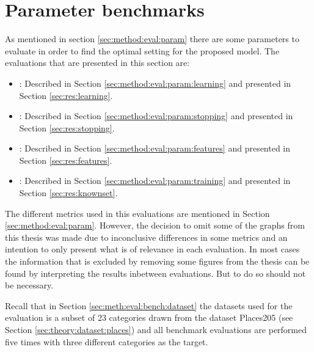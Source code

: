 \section{Parameter benchmarks}
\label{sec:res:param}

As mentioned in section \ref{sec:method:eval:param} there are some parameters to evaluate in order to find the optimal setting for the proposed model. The evaluations that are presented in this section are:
\begin{itemize}
\item \textbf{}: Described in Section \ref{sec:method:eval:param:learning} and presented in Section \ref{sec:res:learning}.
\item \textbf{}: Described in Section \ref{sec:method:eval:param:stopping} and presented in Section \ref{sec:res:stopping}.
\item \textbf{ }: Described in Section \ref{sec:method:eval:param:features} and presented in Section \ref{sec:res:features}.
\item \textbf{}: Described in Section \ref{sec:method:eval:param:training} and presented in Section \ref{sec:res:knownset}.
\end{itemize}
\medskip
The different metrics used in this evaluations are mentioned in Section \ref{sec:method:eval:param}. 
However, the decision to omit some of the graphs from this thesis was made due to inconclusive differences in some metrics and an intention to only present what is of relevance in each evaluation. In most cases the information that is excluded by removing some figures from the thesis can be found by interpreting the results inbetween evaluations. But to do so should not be necessary.

Recall that in Section \ref{sec:meth:eval:bench:dataset} the datasets used for the evaluation is a subset of 23 categories drawn from the dataset Places205 (see Section \ref{sec:theory:dataset:places}) and all benchmark evaluations are performed five times with three different categories as the target.





